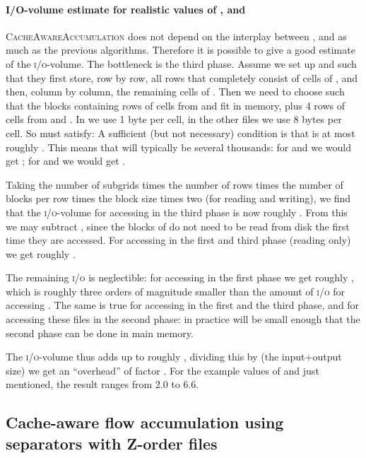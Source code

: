 \documentclass[10pt,a4paper]{article}
\def\io{\textsc{i/o}\xspace}
\begin{document}
\paragraph*{I/O-volume estimate for realistic values of ,  and }
\textsc{CacheAwareAccumulation} does not depend on the interplay between ,  and  as much as the previous algorithms. Therefore it is possible to give a good estimate of the \io-volume. The bottleneck is the third phase. Assume we set up  and  such that they first store, row by row, all rows that completely consist of cells of , and then, column by column, the remaining cells of . Then we need to choose  such that the blocks containing  rows of  cells from  and  fit in memory, plus 4 rows of  cells from  and . In  we use 1 byte per cell, in the other files we use 8 bytes per cell. So  must satisfy:
A sufficient (but not necessary) condition is that  is at most roughly . This means that  will typically be several thousands:
for  and  we would get ; for  and  we would get .

Taking the number of subgrids times the number of rows times the number of blocks per row times the block size times two (for reading and writing), we find that the \io-volume for accessing  in the third phase is now roughly
.
From this we may subtract , since the blocks of  do not need to be read from disk the first time they are accessed.
For accessing  in the first and third phase (reading only) we get roughly
.

The remaining \io is neglectible: for accessing  in the first phase we get roughly
, which is roughly three orders of magnitude smaller than the amount of \io for accessing . The same is true for accessing  in the first and the third phase, and for accessing these files in the second phase: in practice  will be small enough that the second phase can be done in main memory.

The \io-volume thus adds up to roughly , dividing this by  (the input+output size) we get an ``overhead'' of factor . For the example values of  and  just mentioned, the result ranges from 2.0 to 6.6.

\subsection{Cache-aware flow accumulation using separators with Z-order files}\label{sec:cacheawareaccumulationZorder}
\end{document}
